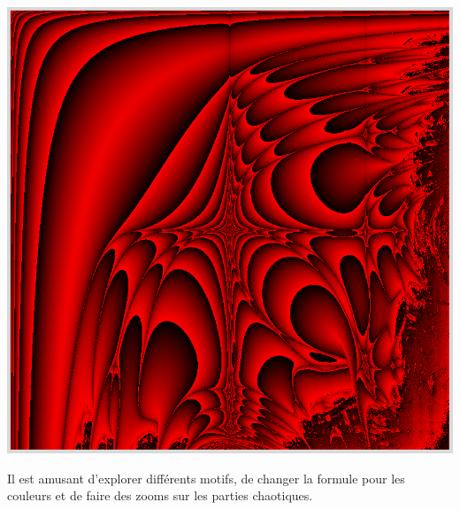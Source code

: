 \documentclass[11pt,class=report,crop=false]{standalone}
\begin{document}
\begin{activite}
\begin{center}
\includegraphics[scale=\myscale,scale=0.15]{ecran-lyapunov-AAAAABABBB}
\end{center}

Il est amusant d'explorer différents motifs, de changer la formule pour les couleurs et de faire des zooms sur les parties chaotiques.


\end{activite}
\end{document}
